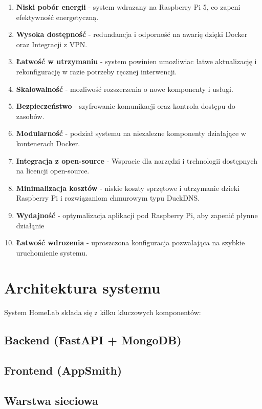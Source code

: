 \begin{enumerate}
    \item \textbf{Niski pobór energii} - system wdrazany na Raspberry Pi 5, co zapeni efektywność energetyczną.
    \item \textbf{Wysoka dostępność} - redundancja i odporność na awarię dzięki Docker oraz Integracji z VPN.
    \item \textbf{Łatwość w utrzymaniu} - system powinien umozliwiac łatwe aktualizację i rekonfigurację w razie potrzeby ręcznej interwencji.
    \item \textbf{Skalowalność} - mozliwość rozszerzenia o nowe komponenty i usługi.
    \item \textbf{Bezpieczeństwo} - szyfrowanie komunikacji oraz kontrola dostępu do zasobów.
    \item \textbf{Modularność} - podział systemu na niezalezne komponenty działające w kontenerach Docker.
    \item \textbf{Integracja z open-source} - Wspracie dla narzędzi i trchnologii dostępnych na licencji open-source.
    \item \textbf{Minimalizacja kosztów} - niskie koszty sprzętowe i utrzymanie dzieki Raspberry Pi i rozwiązaniom chmurowym typu DuckDNS.
    \item \textbf{Wydajność} - optymalizacja aplikacji pod Raspberry Pi, aby zapenić płynne działąnie 
    \item \textbf{Łatwość wdrozenia} - uproszczona konfiguracja pozwalająca na szybkie uruchomienie systemu.
\end{enumerate}

\section{Architektura systemu}
System HomeLab składa się z kilku kluczowych komponentów:

\subsection{Backend (FastAPI + MongoDB)}

\subsection{Frontend (AppSmith)}

\subsection{Warstwa sieciowa}

